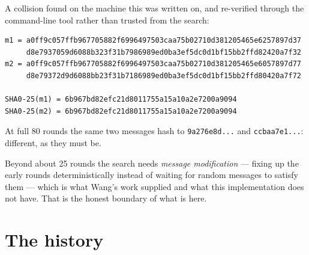 \documentclass[11pt,a4paper]{article}
\begin{document}
A collision found on the machine this was written on, and re-verified through
the command-line tool rather than trusted from the search:

\begin{lstlisting}
m1 = a0ff9c057ffb967705882f6996497503caa75b02710d381205465e6257897d37
     d8e7937059d6088b323f31b7986989ed0ba3ef5dc0d1bf15bb2ffd82420a7f32
m2 = a0ff9c057ffb967705882f6996497503caa75b02710d381205465e6057897d77
     d8e79372d9d6088bb23f31b7186989ed0ba3ef5dc0d1bf15bb2ffd80420a7f72

SHA0-25(m1) = 6b967bd82efc21d8011755a15a10a2e7200a9094
SHA0-25(m2) = 6b967bd82efc21d8011755a15a10a2e7200a9094
\end{lstlisting}

\noindent
At full 80 rounds the same two messages hash to
\texttt{9a276e8d...} and \texttt{ccbaa7e1...}: different, as they must be.

Beyond about 25 rounds the search needs \emph{message modification} --- fixing
up the early rounds deterministically instead of waiting for random messages
to satisfy them --- which is what Wang's work supplied and what this
implementation does not have. That is the honest boundary of what is here.

\section{The history}\label{sec:history}
\end{document}
